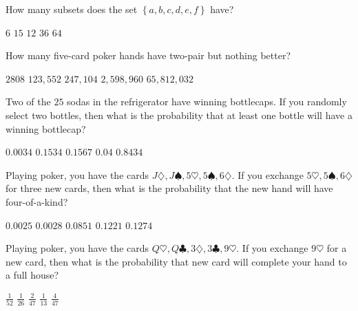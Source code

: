 \documentclass[answers,12pt]{exam}
\begin{document}
\begin{questions}
\question How many subsets does the set
$\left\{a,b,c,d,e,f\right\}$ have?\\
\begin{oneparchoices}
\choice $6$ %
\choice $15$ %
\choice $12$ %
\choice $36$ %
\correctchoice $64$
\end{oneparchoices}

\question 
How many five-card poker hands have two-pair
but nothing better?\\
\begin{oneparchoices}
\choice $2808$ %
\correctchoice $123,552$
\choice $247,104$ %
\choice $2,598,960$ %
\choice $65,812,032$ %
\end{oneparchoices}

\question Two of the $25$ sodas in the refrigerator
have winning bottlecaps. If you randomly select two
bottles, then what is the probability that at least one bottle
will have a winning bottlecap?\\
\begin{oneparchoices}
\choice $0.0034$ %
\choice $0.1534$ %
\correctchoice $0.1567$
\choice $0.04$ %
\choice $0.8434$ %
\end{oneparchoices}

\question Playing poker, you have the cards
$J\diamondsuit,J\spadesuit,5\heartsuit,
5\spadesuit,6\diamondsuit$.
If you exchange $5\heartsuit,5\spadesuit,6\diamondsuit$
for three new cards, then what is the probability
that the new hand will have four-of-a-kind?\\
\begin{oneparchoices}
\choice $0.0025$ %
\correctchoice $0.0028$
\choice $0.0851$ %
\choice $0.1221$ %
\choice $0.1274$ %
\end{oneparchoices}

\question Playing poker, you have the cards
$Q\heartsuit,Q\clubsuit,3\diamondsuit,3\clubsuit,9\heartsuit$.
If you exchange $9\heartsuit$ for a new card,
then what is the probability that new card
will complete your hand to a full house?\\
\begin{oneparchoices}
\choice $\frac{1}{52}$
\choice $\frac{1}{26}$ %
\choice $\frac{2}{47}$ %
\choice $\frac{1}{13}$ %
\correctchoice $\frac{4}{47}$
\end{oneparchoices}

\end{questions}
\end{document}
